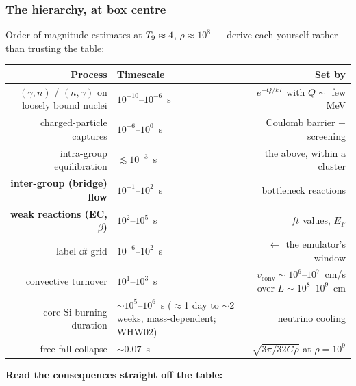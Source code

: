 \subsubsection{The hierarchy, at box centre}
\label{sec:hierarchy}

Order-of-magnitude estimates at $T_{9} \approx 4$, $\rho \approx 10^{8}$ ---
derive each yourself rather than trusting the table:

\begin{center}
\small
\begin{tabularx}{\textwidth}{@{}R{0.930} l R{1.070}@{}}
\toprule
\textbf{Process} & \textbf{Timescale} & \textbf{Set by} \\
\midrule
$(\gamma,n)$ / $(n,\gamma)$ on loosely bound nuclei &
  $10^{-10}$--$10^{-6}$~s & $e^{-Q/kT}$ with $Q \sim$ few MeV \\
charged-particle captures & $10^{-6}$--$10^{0}$~s &
  Coulomb barrier $+$ screening \\
intra-group equilibration & $\lesssim 10^{-3}$~s &
  the above, within a cluster \\
\textbf{inter-group (bridge) flow} & $10^{-1}$--$10^{2}$~s &
  bottleneck reactions \\
\textbf{weak reactions (EC, $\beta$)} & $10^{2}$--$10^{5}$~s &
  $ft$ values, $E_F$ \\
label $\dd t$ grid & $10^{-6}$--$10^{2}$~s &
  $\leftarrow$ the emulator's window \\
convective turnover & $10^{1}$--$10^{3}$~s &
  $v_{\mathrm{conv}} \sim 10^{6}$--$10^{7}$~cm/s over
  $L \sim 10^{8}$--$10^{9}$~cm \\
core Si burning duration &
  ${\sim}10^{5}$--$10^{6}$~s ($\approx$1 day to ${\sim}$2 weeks,
  mass-dependent; WHW02) & neutrino cooling \\
free-fall collapse & ${\sim}0.07$~s &
  $\sqrt{3\pi/32G\rho}$ at $\rho = 10^{9}$ \\
\bottomrule
\end{tabularx}
\end{center}

\textbf{Read the consequences straight off the table:}

